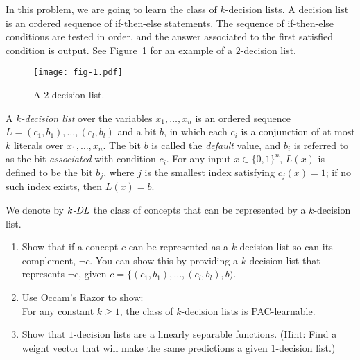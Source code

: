 In this problem, we are going to learn the class of $k$-decision
lists. A decision list is an ordered sequence of if-then-else
statements. The sequence of if-then-else conditions are tested in
order, and the answer associated to the first satisfied condition is
output. See Figure~\ref{fig:decision_list} for an example of a
$2$-decision list.

\begin{figure}[h]
\begin{center}
\texttt{[image: fig-1.pdf]}
\caption{A $2$-decision list.}
\label{fig:decision_list}
\end{center}
\end{figure}

A {\em $k$-decision list} over the variables $x_{1}, \ldots, x_{n}$ is
an ordered sequence $L=(c_{1}, b_{1}), \ldots, (c_{l},b_{l})$ and a
bit $b$, in which each $c_{i}$ is a conjunction of at most $k$
literals over $x_{1},\ldots, x_{n}$. The bit $b$ is called the {\em
  default} value, and $b_{i}$ is referred to as the bit {\em
  associated} with condition $c_{i}$. For any input $x \in \{0,
1\}^{n}$, $L(x)$ is defined to be the bit $b_{j}$, where $j$ is the
smallest index satisfying $c_{j}(x)=1$; if no such index exists, then
$L(x)=b$.

We denote by $k\mbox{\em -DL}$ the class of concepts that can be
represented by a $k$-decision list.


\begin{enumerate}
\item \relax[8 points] Show that if a concept $c$ can be represented
  as a $k$-decision list so can its complement, $\neg c$. You can show
  this by providing a $k$-decision list that represents $\neg c$,
  given $c = \{(c_{1},b_{1}), \ldots, (c_{l},b_{l}),b)$.

\item \relax[9 points] Use  Occam's Razor to show: \\
  For any constant $k \geq 1$, the class of $k$-decision lists is
  PAC-learnable.

\item \relax[8 points] Show that $1$-decision lists are a linearly
  separable functions. (Hint: Find a weight vector that will make the
  same predictions a given $1$-decision list.)

\end{enumerate}



